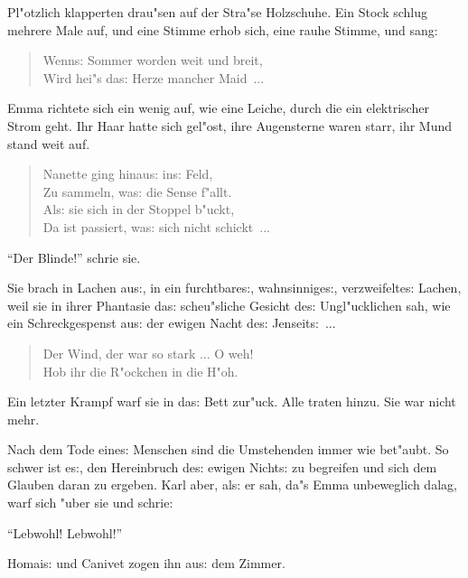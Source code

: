\documentclass[oneside,12pt]{book}
\newcommand{\s}{s:}%
\begin{document}
Pl"otzlich klapperten drau"sen auf der Stra"se Holzschuhe. Ein
Stock schlug mehrere Male auf, und eine Stimme erhob sich, eine
rauhe Stimme, und sang:

\begin{verse}
{\glq}Wenn{\s} Sommer worden weit und breit, \\
Wird hei"s da{\s} Herze mancher Maid~...{\grq}
\end{verse}

Emma richtete sich ein wenig auf, wie eine Leiche, durch die ein
elektrischer Strom geht. Ihr Haar hatte sich gel"ost, ihre
Augensterne waren starr, ihr Mund stand weit auf.

\begin{verse}
{\glq}Nanette ging hinau{\s} in{\s} Feld, \\
Zu sammeln, wa{\s} die Sense f"allt. \\
Al{\s} sie sich in der Stoppel b"uckt, \\
Da ist passiert, wa{\s} sich nicht schickt~...{\grq}
\end{verse}

"`Der Blinde!"' schrie sie.

Sie brach in Lachen au{\s}, in ein furchtbare{\s}, wahnsinnige{\s},
verzweifelte{\s} Lachen, weil sie in ihrer Phantasie da{\s}
scheu"sliche Gesicht de{\s} Ungl"ucklichen sah, wie ein
Schreckgespenst au{\s} der ewigen Nacht de{\s} Jenseit{\s}~...

\begin{verse}
{\glq}Der Wind, der war so stark ... O weh! \\
Hob ihr die R"ockchen in die H"oh.{\grq}
\end{verse}

Ein letzter Krampf warf sie in da{\s} Bett zur"uck. Alle traten
hinzu. Sie war nicht mehr.



\newpage\begin{center}
{\large \so{Zehnte{\s} Kapitel}}\bigskip\bigskip
\end{center}

Nach dem Tode eine{\s} Menschen sind die Umstehenden immer wie
bet"aubt. So schwer ist e{\s}, den Hereinbruch de{\s} ewigen
Nicht{\s} zu begreifen und sich dem Glauben daran zu ergeben. Karl
aber, al{\s} er sah, da"s Emma unbeweglich dalag, warf sich "uber
sie und schrie:

"`Lebwohl! Lebwohl!"'

Homai{\s} und Canivet zogen ihn au{\s} dem Zimmer.
\end{document}
